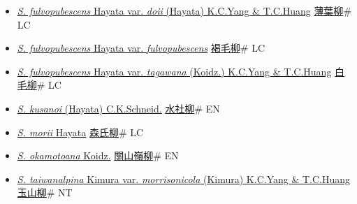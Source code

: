 \begin{itemize}
  \begin{itemize}
        \item[] \href{http://www.theplantlist.org/tpl1.1/search?q=Salix+fulvopubescens+var.+doii}{\textit{S. fulvopubescens} Hayata var. \textit{doii} (Hayata) K.C.Yang \& T.C.Huang}   \href{\detokenize{http://taibnet.sinica.edu.tw/chi/taibnet_species_list.php?T2=薄葉柳&T2_new_value=true&fr=y}}{薄葉柳}\# LC
        \item[] \href{http://www.theplantlist.org/tpl1.1/search?q=Salix+fulvopubescens+var.+fulvopubescens}{\textit{S. fulvopubescens} Hayata var. \textit{fulvopubescens}}   \href{\detokenize{http://taibnet.sinica.edu.tw/chi/taibnet_species_list.php?T2=褐毛柳&T2_new_value=true&fr=y}}{褐毛柳}\# LC
        \item[] \href{http://www.theplantlist.org/tpl1.1/search?q=Salix+fulvopubescens+var.+tagawana}{\textit{S. fulvopubescens} Hayata var. \textit{tagawana} (Koidz.) K.C.Yang \& T.C.Huang}   \href{\detokenize{http://taibnet.sinica.edu.tw/chi/taibnet_species_list.php?T2=白毛柳&T2_new_value=true&fr=y}}{白毛柳}\# LC
        \item[] \href{http://www.theplantlist.org/tpl1.1/search?q=Salix+kusanoi}{\textit{S. kusanoi} (Hayata) C.K.Schneid.}   \href{\detokenize{http://taibnet.sinica.edu.tw/chi/taibnet_species_list.php?T2=水社柳&T2_new_value=true&fr=y}}{水社柳}\# EN
        \item[] \href{http://www.theplantlist.org/tpl1.1/search?q=Salix+morii}{\textit{S. morii} Hayata}   \href{\detokenize{http://taibnet.sinica.edu.tw/chi/taibnet_species_list.php?T2=森氏柳&T2_new_value=true&fr=y}}{森氏柳}\# LC
        \item[] \href{http://www.theplantlist.org/tpl1.1/search?q=Salix+okamotoana}{\textit{S. okamotoana} Koidz.}   \href{\detokenize{http://taibnet.sinica.edu.tw/chi/taibnet_species_list.php?T2=關山嶺柳&T2_new_value=true&fr=y}}{關山嶺柳}\# EN
        \item[] \href{http://www.theplantlist.org/tpl1.1/search?q=Salix+taiwanalpina+var.+morrisonicola}{\textit{S. taiwanalpina} Kimura var. \textit{morrisonicola} (Kimura) K.C.Yang \& T.C.Huang}   \href{\detokenize{http://taibnet.sinica.edu.tw/chi/taibnet_species_list.php?T2=玉山柳&T2_new_value=true&fr=y}}{玉山柳}\# NT

\end{itemize}
\end{itemize}
